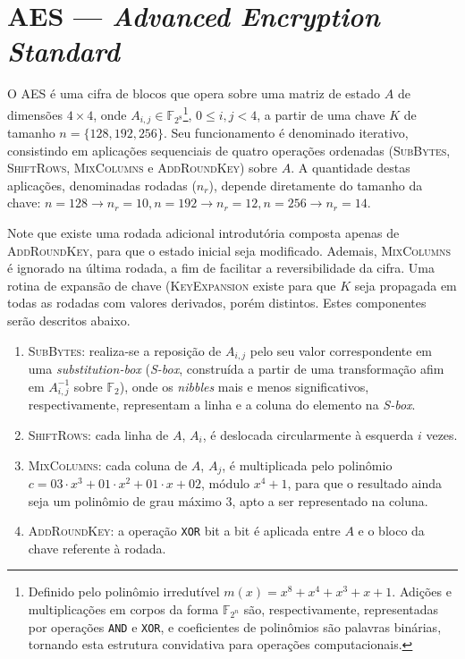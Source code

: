 \documentclass{article}
\begin{document}
\section{AES --- \emph{Advanced Encryption Standard}}

O AES é uma cifra de blocos que opera sobre uma matriz de estado $A$ de dimensões $4 \times 4$, onde $A_{i,j} \in \mathbb{F}_{2^{8}}$\footnote{Definido pelo polinômio irredutível $m(x) = x^{8} + x^{4} + x^{3} + x + 1$. Adições e multiplicações em corpos da forma $\mathbb{F}_{2^n}$ são, respectivamente, representadas por operações \texttt{AND} e \texttt{XOR}, e coeficientes de polinômios são palavras binárias, tornando esta estrutura convidativa para operações computacionais.}, $0 \leq i, j < 4$, a partir de uma chave $K$ de tamanho $n = \{128, 192, 256\}$. Seu funcionamento é denominado iterativo, consistindo em aplicações sequenciais de quatro operações ordenadas (\textsc{SubBytes}, \textsc{ShiftRows}, \textsc{MixColumns} e \textsc{AddRoundKey}) sobre $A$. A quantidade destas aplicações, denominadas rodadas ($n_r$), depende diretamente do tamanho da chave: $n = 128 \rightarrow n_r = 10, n = 192 \rightarrow n_r = 12, n = 256 \rightarrow n_r = 14$.

Note que existe uma rodada adicional introdutória composta apenas de \textsc{AddRoundKey},
para que o estado inicial seja modificado. Ademais, \textsc{MixColumns} é ignorado na última rodada, a fim de facilitar a reversibilidade da cifra. Uma rotina de expansão de chave (\textsc{KeyExpansion} existe para que $K$ seja propagada em todas as rodadas com valores derivados, porém distintos. Estes componentes serão descritos abaixo.

\begin{enumerate}[label=\roman*.]

    \item \textsc{SubBytes}: realiza-se a reposição de $A_{i,j}$
        pelo seu valor correspondente em uma \emph{substitution-box} (\emph{S-box}, construída a partir de uma transformação afim em $A_{i,j}^{-1}$ sobre $\mathbb{F}_2$), onde os \emph{nibbles} mais e menos significativos, respectivamente, representam a linha e a coluna do elemento na \emph{S-box}.

    \item \textsc{ShiftRows}: cada linha de $A$, $A_i$,
        é deslocada circularmente à esquerda $i$ vezes.

    \item \textsc{MixColumns}: cada coluna de $A$, $A_j$, é multiplicada pelo polinômio
        $c = 03 \cdot x^{3} + 01 \cdot x^{2} + 01 \cdot x + 02$, módulo $x^{4} + 1$, para que o resultado ainda seja um polinômio de grau máximo 3, apto a ser representado na coluna.

    \item \textsc{AddRoundKey}: a operação \texttt{XOR} bit a bit é aplicada entre $A$ e o
        bloco da chave referente à rodada.

\end{enumerate}
\end{document}
